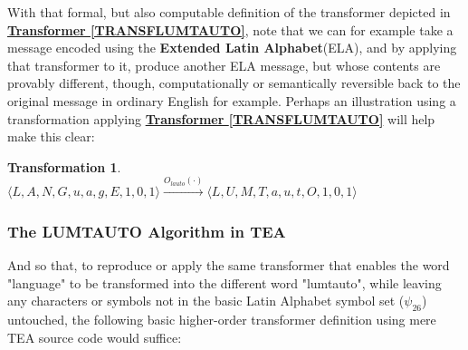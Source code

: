 \documentclass[a4paper, 18pt]{book} %
\newtheorem{trans}{Transformation}
\begin{document}
\vspace{2em}


With that formal, but also computable definition of the transformer depicted in \textbf{\hyperref[TRANSFLUMTAUTO]{Transformer \ref{TRANSFLUMTAUTO}}}, note that we can for example take a message encoded using the \textbf{Extended Latin Alphabet}(ELA)\cite{lutalo_2025_grimlumtauto}, and by applying that transformer to it, produce another ELA message, but whose contents are provably different, though, computationally or semantically reversible back to the original message in ordinary English for example. Perhaps an illustration using a transformation applying \textbf{\hyperref[TRANSFLUMTAUTO]{Transformer \ref{TRANSFLUMTAUTO}}} will help make this clear:

\vspace{2em}

\begin{trans}
$\langle L, A, N, G, u, a, g, E, 1, 0, 1 \rangle \xrightarrow{O_{lauto}(\cdot)} \langle L, U, M, T, a, u, t, O, 1, 0, 1 \rangle$
\end{trans}


\vspace{2em}


\subsubsection{The LUMTAUTO Algorithm in TEA}
\label{SECTEALUMTAUTO}

And so that, to reproduce or apply the same transformer that enables the word "language" to be transformed into the different word "lumtauto", while leaving any characters or symbols not in the basic Latin Alphabet symbol set ($\psi_{26}$) untouched, the following basic higher-order transformer definition using mere TEA source code would suffice:

\vspace{2em}
\end{document}
